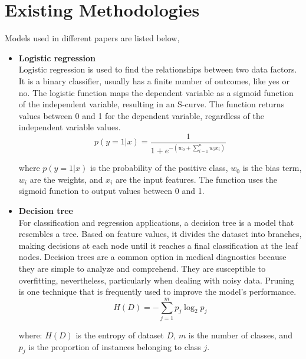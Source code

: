\documentclass[12pt]{article}
\begin{document}
\section{Existing Methodologies}
\label{sec:meth}
Models used in different papers are listed below,
\begin{itemize}
\setlength{\itemsep}{0pt}  %
  \setlength{\parskip}{0pt}
\item \textbf{Logistic regression} \\
 Logistic regression is used to find the
relationships between two data factors.  It is a binary classifier, usually has a finite number of outcomes, like yes or no. The logistic function maps the dependent variable as a sigmoid function of the independent variable, resulting in an S-curve. The function returns values between 0 and 1 for the dependent variable, regardless of the independent variable values.
\begin{equation}
p(y = 1 | x) = \frac{1}{1 + e^{-(w_0 + \sum_{i=1}^{n} w_i x_i)}}
\end{equation}

where \( p(y = 1 | x) \) is the probability of the positive class, \( w_0 \) is the bias term, \( w_i \) are the weights, and \( x_i \) are the input features. The function uses the sigmoid function to output values between 0 and 1.

 
 
\item \textbf{Decision tree} \\
For classification and regression applications, a decision tree is a model that resembles a tree. Based on feature values, it divides the dataset into branches, making decisions at each node until it reaches a final classification at the leaf nodes. Decision trees are a common option in medical diagnostics because they are simple to analyze and comprehend. They are susceptible to overfitting, nevertheless, particularly when dealing with noisy data. Pruning is one technique that is frequently used to improve the model's performance.
\begin{equation}
H(D) = - \sum_{j=1}^{m} p_j \log_2 p_j
\end{equation}

where:
$H(D)$ is the entropy of dataset $D$, $m$ is the number of classes, and $p_j$ is the proportion of instances belonging to class $j$.




\end{itemize}
\end{document}

